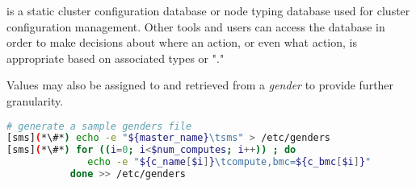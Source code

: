 \genders{} is a static cluster configuration database or node typing database
used for cluster configuration management. Other tools and users can access the
\genders{} database in order to make decisions about where an action, or even
what action, is appropriate based on associated types or "\genders{}."

Values may also be assigned to and retrieved from a {\em gender} to provide
further granularity.

\begin{lstlisting}[language=bash,keywords={},upquote=true]
# generate a sample genders file
[sms](*\#*) echo -e "${master_name}\tsms" > /etc/genders
[sms](*\#*) for ((i=0; i<$num_computes; i++)) ; do
              echo -e "${c_name[$i]}\tcompute,bmc=${c_bmc[$i]}"
           done >> /etc/genders
\end{lstlisting}

